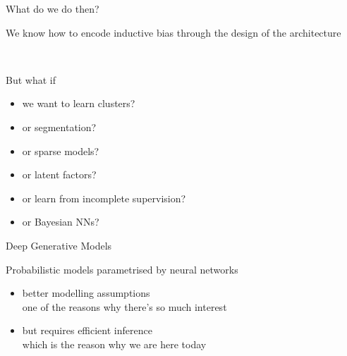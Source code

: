 \documentclass[14pt]{beamer}
\begin{document}
\begin{frame}{What do we do then?}

\begin{small}
\begin{figure}
\end{figure}
\end{small}
We know how to encode inductive bias through the design of the architecture 

~ \pause

But what if
\begin{small}
\begin{multicols}{2}
	\begin{itemize}
		\item we want to learn clusters?
		\item or segmentation?
		\item or sparse models?
		\item or latent factors?
		\item or learn from incomplete supervision?
		\item or Bayesian NNs?
	\end{itemize}
\end{multicols}
\end{small}

\end{frame}

\begin{frame}{Deep Generative Models}

Probabilistic models parametrised by neural networks
\begin{itemize}
	\pause
	\item better modelling assumptions\\
	one of the reasons why there's so much interest	
	\pause
	\item but requires efficient inference\\
	\pause
	\alert{which is the reason why we are here today}
\end{itemize}

\end{frame}
\end{document}
